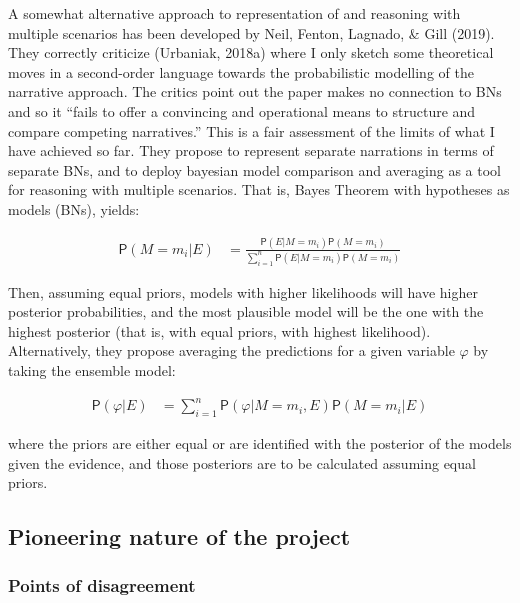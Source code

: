 \documentclass[11pt,dvipsnames,enabledeprecatedfontcommands]{scrartcl}
\newcommand{\pr}[1]{\mathsf{P}(#1)}
\begin{document}
A somewhat alternative approach to representation of and reasoning with
multiple scenarios has been developed by Neil, Fenton, Lagnado, \& Gill
(2019). They correctly criticize (Urbaniak, 2018a) where I only sketch
some theoretical moves in a second-order language towards the
probabilistic modelling of the narrative approach. The critics point out
the paper makes no connection to BNs and so it ``fails to offer a
convincing and operational means to structure and compare competing
narratives.'' This is a fair assessment of the limits of what I have
achieved so far. They propose to represent separate narrations in terms
of separate BNs, and to deploy bayesian model comparison and averaging
as a tool for reasoning with multiple scenarios. That is, Bayes Theorem
with hypotheses as models (BNs), yields:

\vspace{-3mm}

\begin{align}
\pr{M=m_i\vert E} & = \frac{
\pr{E\vert M = m_i}\pr{M= m_i}
}
{
\sum_{i=1}^{n}\pr{E \vert M = m_i}\pr{M = m_i}
}
\end{align}

\noindent Then, assuming equal priors, models with higher likelihoods
will have higher posterior probabilities, and the most plausible model
will be the one with the highest posterior (that is, with equal priors,
with highest likelihood). Alternatively, they propose averaging the
predictions for a given variable \(\varphi\) by taking the ensemble
model:

\vspace{-3mm}

\begin{align}
\pr{\varphi \vert E} & = \sum_{i=1}^n \pr{\varphi \vert M=m_i, E} \pr{M=m_i\vert E}
\end{align}

\vspace{-2mm}

\noindent where the priors are either equal or are identified with the
posterior of the models given the evidence, and those posteriors are to
be calculated assuming equal priors.

\subsection{Pioneering nature of the
project}\label{pioneering-nature-of-the-project}

\subsubsection{Points of disagreement}\label{points-of-disagreement}
\end{document}

